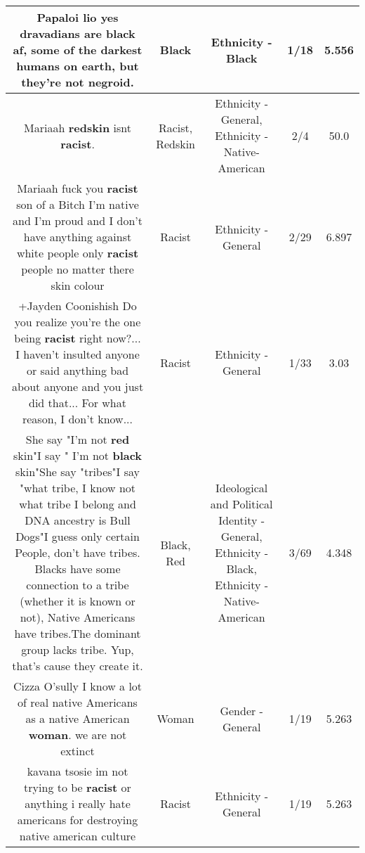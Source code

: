 \documentclass[11pt]{article}
\newlength\mylength
\begin{document}
\begin{center}
\begin{longtable}{|C{.65\mylength}|C{.30\mylength}|C{.12\mylength}|C{.12\mylength}|C{.12\mylength}|}
  \small Papaloi lio yes dravadians are \textbf{black} af, some of the darkest humans on earth, but they're not negroid.\normalsize   & Black & Ethnicity - Black & 1/18 & 5.556 \\  \hline
  \small Mariaah \textbf{redskin} isnt \textbf{racist}.\normalsize   & Racist, Redskin & Ethnicity - General, Ethnicity - Native-American & 2/4 & 50.0 \\  \hline
  \small Mariaah fuck you \textbf{racist} son of a Bitch I'm native and I'm proud and I don't have anything against white people only \textbf{racist} people no matter there skin colour\normalsize   & Racist & Ethnicity - General & 2/29 & 6.897 \\  \hline
  \small +Jayden Coonishish Do you realize you're the one being \textbf{racist} right now?... I haven't insulted anyone or said anything bad about anyone and you just did that... For what reason, I don't know...\normalsize   & Racist & Ethnicity - General & 1/33 & 3.03 \\  \hline
  \small She say "I'm not \textbf{r\textbf{ed}} skin"I say " I'm not \textbf{black} skin"She say "tribes"I say "what tribe, I know not what tribe I belong and DNA ancestry is Bull Dogs"I guess only certain People, don't have tribes. Blacks have some connection to a tribe (whether it is known or not), Native Americans have tribes.The dominant group lacks tribe. Yup, that's cause they create it.\normalsize   & Black, Red &  Ideological and Political Identity - General, Ethnicity - Black, Ethnicity - Native-American & 3/69 & 4.348 \\  \hline
  \small Cizza O'sully I know a lot of real native Americans as a native American \textbf{woman}.  we are not extinct\normalsize   & Woman & Gender - General & 1/19 & 5.263 \\  \hline
  \small kavana tsosie im not trying to be \textbf{racist} or anything i really hate americans for destroying native american culture\normalsize   & Racist & Ethnicity - General & 1/19 & 5.263 \\  \hline

\end{longtable}
\end{center}
\end{document}
